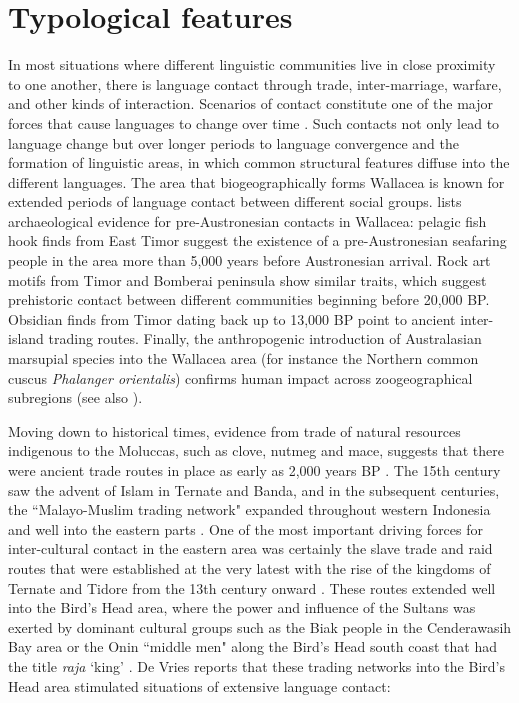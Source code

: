 \section{Typological features}\label{sec:typo}
In most situations where different linguistic communities live in close proximity to one another, there is language contact through trade, inter-marriage, warfare, and other kinds of interaction. Scenarios of contact constitute one of the major forces that cause languages to change over time \citep{thomason2001language}. Such contacts not only lead to language change but over longer periods to language convergence and the formation of linguistic areas, in which common structural features diffuse into the different languages. The area that biogeographically forms Wallacea is known for extended periods of language contact between different social groups. \citet[141f.]{schapper2015wallacea} lists archaeological evidence for pre-Austronesian contacts in Wallacea: pelagic fish hook finds from East Timor suggest the existence of a pre-Austronesian seafaring people in the area more than 5,000 years before Austronesian arrival. Rock art motifs from Timor and Bomberai peninsula show similar traits, which suggest prehistoric contact between different communities beginning before 20,000 BP. Obsidian finds from Timor dating back up to 13,000 BP point to ancient inter-island trading routes. Finally, the anthropogenic introduction of Australasian marsupial species into the Wallacea area (for instance the Northern common cuscus \textit{Phalanger orientalis}) confirms human impact across zoogeographical subregions (see also \citealt{Heinsohn2010}).

Moving down to historical times, evidence from trade of natural resources indigenous to the Moluccas, such as clove, nutmeg and mace, suggests that there were ancient trade routes in place as early as 2,000 years BP \citep{klamer2008east}. The 15th century saw the advent of Islam in Ternate and Banda, and in the subsequent centuries, the ``Malayo-Muslim trading network" expanded throughout western Indonesia and well into the eastern parts \citep{klamer2008east}. One of the most important driving forces for inter-cultural contact in the eastern area was certainly the slave trade and raid routes that were established at the very latest with the rise of the kingdoms of Ternate and Tidore from the 13th century onward \citep{klamer2008east}. These routes extended well into the Bird's Head area, where the power and influence of the Sultans was exerted by dominant cultural groups such as the Biak people in the Cenderawasih Bay area \citep[2]{vanheuvel2006} or the Onin ``middle men" along the Bird's Head south coast that had the title \textit{raja} `king' \citep[2]{devries2004}. De Vries reports that these trading networks into the Bird's Head area stimulated situations of extensive language contact:

